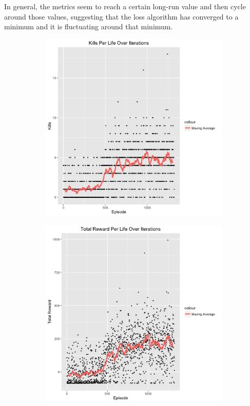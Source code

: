 \documentclass{article}
\begin{document}
\begin{multicols}{2}
In general, the metrics seem to reach a certain long-run value and then cycle around those values, suggesting that the loss algorithm has converged to a minimum and it is fluctuating around that minimum.

\begin{figure}[H]
\caption{Results on Easy Difficulty}
\begin{subfigure}{.25\textwidth}
  \centering
  \includegraphics[scale=0.27]{./kills.png}
  \caption{}
  \label{fig:sfig4}
\end{subfigure}
\begin{subfigure}{.25\textwidth}
  \centering
  \includegraphics[scale=0.27]{./reward.png}

\end{subfigure}
\end{figure}
\end{multicols}
\end{document}
